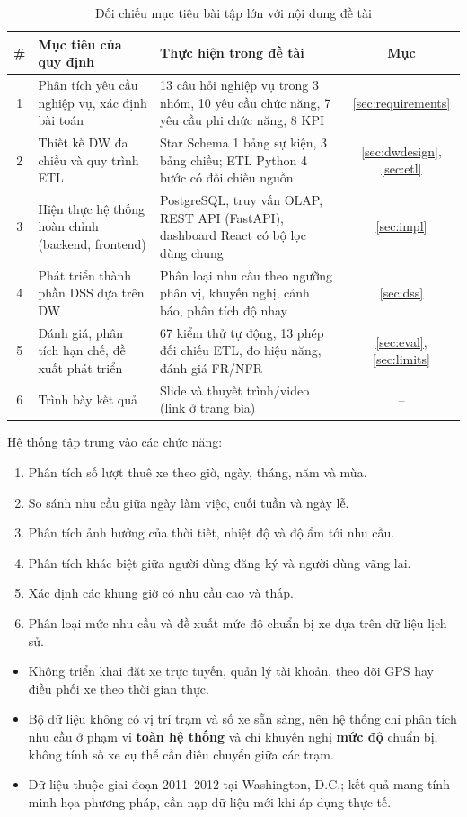 \begin{table}[H]
\centering
\caption{Đối chiếu mục tiêu bài tập lớn với nội dung đề tài}
\label{tab:objectives}
\begin{tabularx}{\textwidth}{|c|p{4.6cm}|X|c|}
\hline
\textbf{\#} & \textbf{Mục tiêu của quy định} & \textbf{Thực hiện trong đề tài} & \textbf{Mục} \\ \hline
1 & Phân tích yêu cầu nghiệp vụ, xác định bài toán & 13 câu hỏi nghiệp vụ trong 3 nhóm, 10 yêu cầu chức năng, 7 yêu cầu phi chức năng, 8 KPI & \ref{sec:requirements} \\ \hline
2 & Thiết kế DW đa chiều và quy trình ETL & Star Schema 1 bảng sự kiện, 3 bảng chiều; ETL Python 4 bước có đối chiếu nguồn & \ref{sec:dwdesign}, \ref{sec:etl} \\ \hline
3 & Hiện thực hệ thống hoàn chỉnh (backend, frontend) & PostgreSQL, truy vấn OLAP, REST API (FastAPI), dashboard React có bộ lọc dùng chung & \ref{sec:impl} \\ \hline
4 & Phát triển thành phần DSS dựa trên DW & Phân loại nhu cầu theo ngưỡng phân vị, khuyến nghị, cảnh báo, phân tích độ nhạy & \ref{sec:dss} \\ \hline
5 & Đánh giá, phân tích hạn chế, đề xuất phát triển & 67 kiểm thử tự động, 13 phép đối chiếu ETL, đo hiệu năng, đánh giá FR/NFR & \ref{sec:eval}, \ref{sec:limits} \\ \hline
6 & Trình bày kết quả & Slide và thuyết trình/video (link ở trang bìa) & -- \\ \hline
\end{tabularx}
\end{table}

Hệ thống tập trung vào các chức năng:
\begin{enumerate}
    \item Phân tích số lượt thuê xe theo giờ, ngày, tháng, năm và mùa.
    \item So sánh nhu cầu giữa ngày làm việc, cuối tuần và ngày lễ.
    \item Phân tích ảnh hưởng của thời tiết, nhiệt độ và độ ẩm tới nhu cầu.
    \item Phân tích khác biệt giữa người dùng đăng ký và người dùng vãng lai.
    \item Xác định các khung giờ có nhu cầu cao và thấp.
    \item Phân loại mức nhu cầu và đề xuất mức độ chuẩn bị xe dựa trên dữ liệu lịch sử.
\end{enumerate}

\begin{itemize}
    \item Không triển khai đặt xe trực tuyến, quản lý tài khoản, theo dõi GPS hay điều phối xe theo thời gian thực.
    \item Bộ dữ liệu không có vị trí trạm và số xe sẵn sàng, nên hệ thống chỉ phân tích nhu cầu ở phạm vi \textbf{toàn hệ thống} và chỉ khuyến nghị \textbf{mức độ} chuẩn bị, không tính số xe cụ thể cần điều chuyển giữa các trạm.
    \item Dữ liệu thuộc giai đoạn 2011--2012 tại Washington, D.C.; kết quả mang tính minh họa phương pháp, cần nạp dữ liệu mới khi áp dụng thực tế.
\end{itemize}

